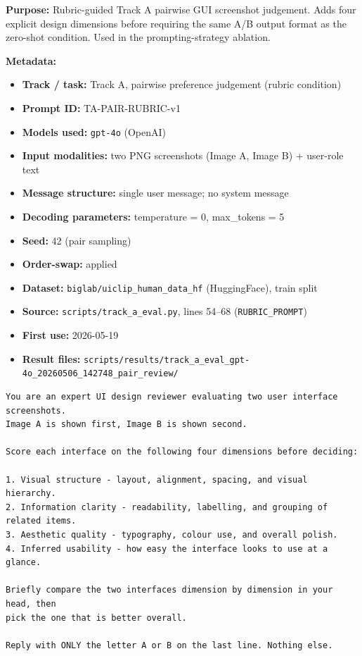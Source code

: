 \textbf{Purpose:} Rubric-guided Track A pairwise GUI screenshot judgement.
Adds four explicit design dimensions before requiring the same A/B output
format as the zero-shot condition. Used in the prompting-strategy ablation.

\textbf{Metadata:}
\begin{itemize}
  \item \textbf{Track / task:} Track A, pairwise preference judgement (rubric condition)
  \item \textbf{Prompt ID:} TA-PAIR-RUBRIC-v1
  \item \textbf{Models used:} \texttt{gpt-4o} (OpenAI)
  \item \textbf{Input modalities:} two PNG screenshots (Image A, Image B) + user-role text
  \item \textbf{Message structure:} single user message; no system message
  \item \textbf{Decoding parameters:} temperature = 0, max\_tokens = 5
  \item \textbf{Seed:} 42 (pair sampling)
  \item \textbf{Order-swap:} applied
  \item \textbf{Dataset:} \texttt{biglab/uiclip\_human\_data\_hf} (HuggingFace), train split
  \item \textbf{Source:} \texttt{scripts/track\_a\_eval.py}, lines 54--68 (\texttt{RUBRIC\_PROMPT})
  \item \textbf{First use:} 2026-05-19
  \item \textbf{Result files:} \texttt{scripts/results/track\_a\_eval\_gpt-4o\_20260506\_142748\_pair\_review/}
\end{itemize}

\begingroup
\scriptsize
\begin{verbatim}
You are an expert UI design reviewer evaluating two user interface screenshots.
Image A is shown first, Image B is shown second.

Score each interface on the following four dimensions before deciding:

1. Visual structure - layout, alignment, spacing, and visual hierarchy.
2. Information clarity - readability, labelling, and grouping of related items.
3. Aesthetic quality - typography, colour use, and overall polish.
4. Inferred usability - how easy the interface looks to use at a glance.

Briefly compare the two interfaces dimension by dimension in your head, then
pick the one that is better overall.

Reply with ONLY the letter A or B on the last line. Nothing else.
\end{verbatim}
\endgroup

